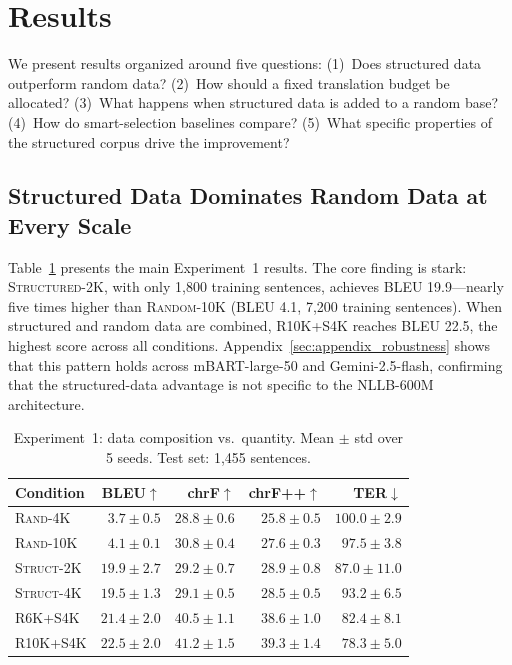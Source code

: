 \documentclass[11pt]{article}
\begin{document}

\section{Results}
\label{sec:results}

We present results organized around five questions: (1)~Does structured data outperform random data? (2)~How should a fixed translation budget be allocated? (3)~What happens when structured data is added to a random base? (4)~How do smart-selection baselines compare? (5)~What specific properties of the structured corpus drive the improvement?

\subsection{Structured Data Dominates Random Data at Every Scale}

Table~\ref{tab:exp1_results} presents the main Experiment~1 results. The core finding is stark: \textsc{Structured-2K}, with only 1,800 training sentences, achieves BLEU 19.9---nearly five times higher than \textsc{Random-10K} (BLEU 4.1, 7,200 training sentences). When structured and random data are combined, \textsc{R10K+S4K} reaches BLEU 22.5, the highest score across all conditions. Appendix~\ref{sec:appendix_robustness} shows that this pattern holds across mBART-large-50 and Gemini-2.5-flash, confirming that the structured-data advantage is not specific to the NLLB-600M architecture.

\begin{table}[t]
\centering
\small
\caption{Experiment~1: data composition vs.\ quantity. Mean $\pm$ std over 5 seeds. Test set: 1,455 sentences.}
\label{tab:exp1_results}
\begin{tabular}{lrrrr}
\toprule
\textbf{Condition} & \textbf{BLEU}$\uparrow$ & \textbf{chrF}$\uparrow$ & \textbf{chrF++}$\uparrow$ & \textbf{TER}$\downarrow$ \\
\midrule
\textsc{Rand-4K}    & $3.7 \pm 0.5$  & $28.8 \pm 0.6$  & $25.8 \pm 0.5$  & $100.0 \pm 2.9$ \\
\textsc{Rand-10K}   & $4.1 \pm 0.1$  & $30.8 \pm 0.4$  & $27.6 \pm 0.3$  & $97.5 \pm 3.8$ \\
\textsc{Struct-2K}  & $19.9 \pm 2.7$ & $29.2 \pm 0.7$  & $28.9 \pm 0.8$  & $87.0 \pm 11.0$ \\
\textsc{Struct-4K}  & $19.5 \pm 1.3$ & $29.1 \pm 0.5$  & $28.5 \pm 0.5$  & $93.2 \pm 6.5$ \\
\textsc{R6K+S4K}    & $21.4 \pm 2.0$ & $40.5 \pm 1.1$  & $38.6 \pm 1.0$  & $82.4 \pm 8.1$ \\
\textsc{R10K+S4K}   & $\mathbf{22.5 \pm 2.0}$ & $\mathbf{41.2 \pm 1.5}$ & $\mathbf{39.3 \pm 1.4}$ & $\mathbf{78.3 \pm 5.0}$ \\
\bottomrule
\end{tabular}
\end{table}
\end{document}
